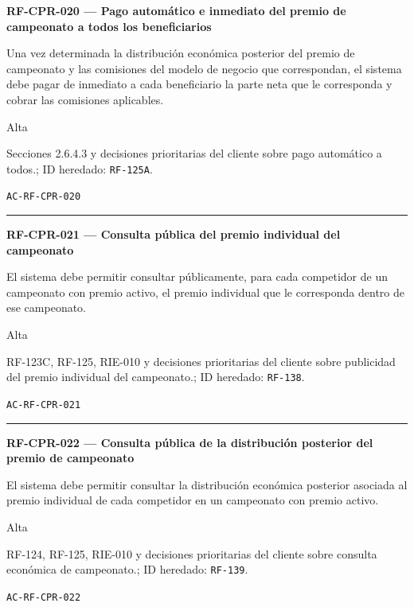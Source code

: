 \documentclass[10pt,letterpaper]{article}
\begin{document}
\noindent\textbf{RF-CPR-020 --- Pago automático e inmediato del premio de campeonato a todos los beneficiarios}\par
\begin{description}[style=nextline,leftmargin=3.15cm,labelwidth=2.8cm,font=\normalfont\bfseries]
\item[Obligación] Una vez determinada la distribución económica posterior del premio de campeonato y las comisiones del modelo de negocio que correspondan, el sistema debe pagar de inmediato a cada beneficiario la parte neta que le corresponda y cobrar las comisiones aplicables.
\item[Prioridad] Alta
\item[Procedencia] Secciones 2.6.4.3 y decisiones prioritarias del cliente sobre pago automático a todos.; ID heredado: \texttt{RF-125A}.
\item[Verificación] \texttt{AC-RF-CPR-020}
\end{description}
\vspace{0.25em}\hrule\vspace{0.65em}
\noindent\textbf{RF-CPR-021 --- Consulta pública del premio individual del campeonato}\par
\begin{description}[style=nextline,leftmargin=3.15cm,labelwidth=2.8cm,font=\normalfont\bfseries]
\item[Obligación] El sistema debe permitir consultar públicamente, para cada competidor de un campeonato con premio activo, el premio individual que le corresponda dentro de ese campeonato.
\item[Prioridad] Alta
\item[Procedencia] RF-123C, RF-125, RIE-010 y decisiones prioritarias del cliente sobre publicidad del premio individual del campeonato.; ID heredado: \texttt{RF-138}.
\item[Verificación] \texttt{AC-RF-CPR-021}
\end{description}
\vspace{0.25em}\hrule\vspace{0.65em}
\noindent\textbf{RF-CPR-022 --- Consulta pública de la distribución posterior del premio de campeonato}\par
\begin{description}[style=nextline,leftmargin=3.15cm,labelwidth=2.8cm,font=\normalfont\bfseries]
\item[Obligación] El sistema debe permitir consultar la distribución económica posterior asociada al premio individual de cada competidor en un campeonato con premio activo.
\item[Prioridad] Alta
\item[Procedencia] RF-124, RF-125, RIE-010 y decisiones prioritarias del cliente sobre consulta económica de campeonato.; ID heredado: \texttt{RF-139}.
\item[Verificación] \texttt{AC-RF-CPR-022}
\end{description}
\end{document}
